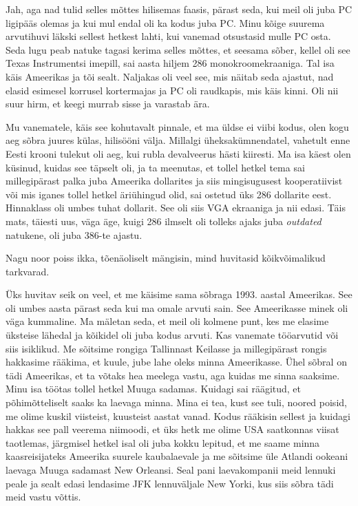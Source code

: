
Jah, aga nad tulid  selles mõttes  hilisemas faasis, pärast seda, kui meil oli 
juba PC ligipääs olemas ja kui mul endal oli ka kodus juba PC. Minu  kõige 
suurema arvutihuvi läkski sellest hetkest lahti, kui vanemad otsustasid mulle 
PC osta. Seda lugu peab natuke tagasi kerima selles mõttes, et seesama sõber, 
kellel oli see Texas Instrumentsi imepill, sai aasta hiljem 
286  monokroomekraaniga. Tal isa käis Ameerikas ja  tõi 
sealt. Naljakas oli veel see, mis näitab seda ajastut, nad elasid esimesel 
korrusel kortermajas ja PC oli raudkapis, mis käis kinni. Oli nii suur hirm, et 
keegi murrab sisse ja varastab ära.


Mu vanematele, käis see kohutavalt pinnale, et ma üldse ei viibi kodus, olen 
kogu aeg sõbra juures külas, hilisööni välja. Millalgi üheksakümnendatel, 
vahetult enne Eesti krooni tulekut oli aeg, kui rubla devalveerus hästi 
kiiresti. Ma isa käest olen küsinud, kuidas see täpselt oli, ja ta meenutas, et 
tollel hetkel tema sai millegipärast palka juba Ameerika dollarites  ja siis 
mingisugusest kooperatiivist või mis iganes tollel hetkel äriühingud olid, sai 
ostetud üks 286 dollarite eest.  Hinnaklass oli umbes tuhat dollarit. See oli 
siis VGA ekraaniga ja nii edasi. Täis mats, täiesti uus, väga äge, kuigi 286 
ilmselt oli tolleks ajaks juba \emph{outdated}  natukene,  oli juba 386-te 
ajastu.


Nagu noor poiss ikka, tõenäoliselt mängisin, mind huvitasid kõikvõimalikud 
tarkvarad. 

Üks huvitav seik on veel, et me käisime sama sõbraga 1993. aastal Ameerikas. 
See oli umbes aasta pärast seda kui ma omale arvuti sain. See Ameerikasse 
minek oli väga kummaline. Ma mäletan seda, et meil oli  kolmene punt, kes me 
elasime üksteise lähedal ja  kõikidel oli juba kodus arvuti. Kas vanemate 
tööarvutid või siis isiklikud. Me sõitsime rongiga Tallinnast Keilasse ja 
millegipärast rongis hakkasime rääkima, et kuule, jube lahe oleks minna 
Ameerikasse. Ühel sõbral on tädi Ameerikas, et ta võtaks hea meelega vastu, aga 
kuidas me sinna saaksime. Minu isa töötas tollel hetkel Muuga 
sadamas. Kuidagi sai räägitud, et põhimõtteliselt saaks ka 
laevaga minna. Mina ei tea, kust see tuli, noored poisid, me olime kuskil 
viisteist, kuusteist aastat vanad. Kodus rääkisin sellest ja kuidagi hakkas see 
pall veerema niimoodi, et üks hetk me olime USA saatkonnas viisat taotlemas, 
järgmisel hetkel isal oli juba kokku lepitud, et me saame minna kaasreisijateks 
Ameerika suurele kaubalaevale ja me sõitsime üle Atlandi ookeani laevaga Muuga 
sadamast New Orleansi. Seal pani laevakompanii meid lennuki peale ja sealt 
edasi lendasime JFK lennuväljale New Yorki, kus siis sõbra tädi meid vastu 
võttis. 

